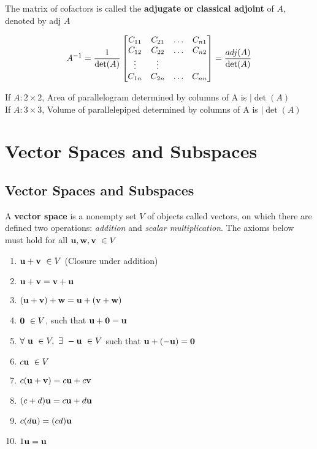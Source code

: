 \documentclass{report}
\begin{document}
The matrix of cofactors is called the \textbf{adjugate or classical adjoint} of $A$,
denoted by adj $A$

\begin{theorem}
    \[
    A^{-1} = \frac{1}{\det(A)}\begin{bmatrix}
        C_{11} & C_{21} &\ldots & C_{n1} \\
        C_{12} & C_{22} &\ldots & C_{n2} \\
        \vdots & \vdots & \\
        C_{1n} & C_{2n} &\ldots & C_{nn} \\
    \end{bmatrix} = \frac{adj(A)}{\det(A)}
    \] 
\end{theorem}

\begin{theorem}
    If $A: 2 \times 2$, Area of parallelogram determined by columns of A is $|\det(A)$\\
    If $A: 3 \times 3$, Volume of parallelepiped determined by columns of A is $|\det(A)$\\
\end{theorem}

\chapter{Vector Spaces and Subspaces}

\section{Vector Spaces and Subspaces}

\begin{definition}
    A \textbf{vector space} is a nonempty set $V$ of objects called vectors, on which there are defined two operations:
    \textit{addition} and \textit{scalar multiplication}. The axioms below must hold for all $\mathbf{u}, \mathbf{w}, \mathbf{v} \ \in V$
\end{definition}
\begin{tcolorbox}[colback=blue!5!white, colframe=blue!75!black]
\begin{enumerate}
    \item $\mathbf{u} + \mathbf{v} \ \in V$ (Closure under addition)
    \item $\mathbf{u} + \mathbf{v} = \mathbf{v} + \mathbf{u}$
    \item $(\mathbf{u} + \mathbf{v}) + \mathbf{w} = \mathbf{u} + (\mathbf{v} + \mathbf{w})$
    \item $\mathbf{0} \ \in V$, such that $\mathbf{u} + \mathbf{0} = \mathbf{u}$
    \item $\forall \ \uu \ \in V, \ \exists \ -\uu \ \in V$ such that $\mathbf{u} + (-\mathbf{u}) = \mathbf{0}$
    \item $c \mathbf{u} \ \in V$
    \item $c (\mathbf{u} + \mathbf{v}) = c \mathbf{u} + c \mathbf{v}$
    \item $(c + d) \mathbf{u} = c \mathbf{u} + d \mathbf{u}$
    \item $c (d \mathbf{u}) = (c d) \mathbf{u}$
    \item $1 \mathbf{u} = \mathbf{u}$
\end{enumerate}
\end{tcolorbox}
\end{document}

